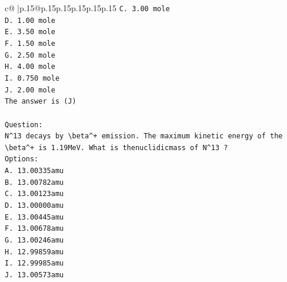 \documentclass{article}
\begin{document}
{\begin{supertabular}{c@{$\;$}|p{.15\linewidth}@{}p{.15\linewidth}p{.15\linewidth}p{.15\linewidth}p{.15\linewidth}p{.15\linewidth}}
{{{\texttt{C. 3.00 mole} \\
\texttt{D. 1.00 mole} \\
\texttt{E. 3.50 mole} \\
\texttt{F. 1.50 mole} \\
\texttt{G. 2.50 mole} \\
\texttt{H. 4.00 mole} \\
\texttt{I. 0.750 mole} \\
\texttt{J. 2.00 mole} \\
\texttt{The answer is (J)} \\
\\ 
\texttt{Question:} \\
\texttt{N\^{}13 decays by \textbackslash{}beta\^{}+ emission. The maximum kinetic energy of the \textbackslash{}beta\^{}+ is 1.19MeV. What is thenuclidicmass of N\^{}13 ?} \\
\texttt{Options:} \\
\texttt{A. 13.00335amu} \\
\texttt{B. 13.00782amu} \\
\texttt{C. 13.00123amu} \\
\texttt{D. 13.00000amu} \\
\texttt{E. 13.00445amu} \\
\texttt{F. 13.00678amu} \\
\texttt{G. 13.00246amu} \\
\texttt{H. 12.99859amu} \\
\texttt{I. 12.99985amu} \\
\texttt{J. 13.00573amu} \\
            }
        }
    }
     \\ \\


\end{supertabular}}
\end{document}
